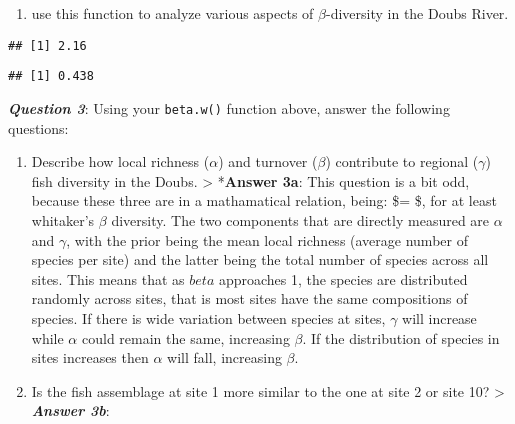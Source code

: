 \documentclass[
]{article}
\newenvironment{Shaded}{\begin{snugshade}}{\end{snugshade}}
\newcommand{\DecValTok}[1]{\textcolor[rgb]{0.00,0.00,0.81}{#1}}
\newcommand{\FunctionTok}[1]{\textcolor[rgb]{0.00,0.00,0.00}{#1}}
\newcommand{\NormalTok}[1]{#1}
\newcommand{\SpecialCharTok}[1]{\textcolor[rgb]{0.00,0.00,0.00}{#1}}
\providecommand{\tightlist}{%
  \setlength{\itemsep}{0pt}\setlength{\parskip}{0pt}}
\begin{document}
\begin{enumerate}
\def\labelenumi{\arabic{enumi}.}
\setcounter{enumi}{1}
\tightlist
\item
  use this function to analyze various aspects of \(\beta\)-diversity in
  the Doubs River.
\end{enumerate}

\begin{Shaded}
\end{Shaded}

\begin{verbatim}
## [1] 2.16
\end{verbatim}

\begin{Shaded}
\end{Shaded}

\begin{verbatim}
## [1] 0.438
\end{verbatim}

\textbf{\emph{Question 3}}: Using your \texttt{beta.w()} function above,
answer the following questions:

\begin{enumerate}
\def\labelenumi{\alph{enumi}.}
\item
  Describe how local richness (\(\alpha\)) and turnover (\(\beta\))
  contribute to regional (\(\gamma\)) fish diversity in the Doubs.
  \textgreater{} *\textbf{Answer 3a}: This question is a bit odd,
  because these three are in a mathamatical relation, being: \$\gamma =
  \alpha \beta \$, for at least whitaker's \(\beta\) diversity. The two
  components that are directly measured are \(\alpha\) and \(\gamma\),
  with the prior being the mean local richness (average number of
  species per site) and the latter being the total number of species
  across all sites. This means that as \(beta\) approaches 1, the
  species are distributed randomly across sites, that is most sites have
  the same compositions of species. If there is wide variation between
  species at sites, \(\gamma\) will increase while \(\alpha\) could
  remain the same, increasing \(\beta\). If the distribution of species
  in sites increases then \(\alpha\) will fall, increasing \(\beta\).
\item
  Is the fish assemblage at site 1 more similar to the one at site 2 or
  site 10? \textgreater{} \textbf{\emph{Answer 3b}}:
\end{enumerate}
\end{document}
